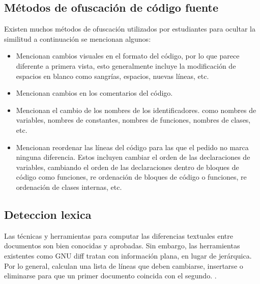 \subsection{Métodos de ofuscación de código fuente}
Existen muchos métodos de ofuscación utilizados por estudiantes para ocultar la similitud a continuación se mencionan algunos:
\begin{itemize}
    \item \cite{article3} Mencionan cambios visuales en el formato del código, por lo que parece diferente a primera vista, esto generalmente incluye la modificación de espacios en blanco como sangrías, espacios, nuevas líneas, etc.
    \item \cite{article3} Mencionan cambios en los comentarios del código.
    \item \cite{donaldson1981plagiarism} Mencionan el cambio de los nombres de los identificadores. como nombres de variables, nombres de constantes, nombres de funciones, nombres de clases, etc.
    \item \cite{donaldson1981plagiarism} Mencionan reordenar las líneas del código para las que el pedido no marca ninguna diferencia. Estos incluyen cambiar el orden de las declaraciones de variables, cambiando el orden de las declaraciones dentro de bloques de código como funciones, re ordenación de bloques de código o funciones, re ordenación de clases internas, etc.
\end{itemize}
\subsection{Deteccion lexica}
Las técnicas y herramientas para computar las diferencias textuales entre documentos son bien conocidas y aprobadas. Sin embargo, las herramientas existentes como GNU diff tratan con información plana, en lugar de jerárquica. Por lo general, calculan una lista de líneas que deben cambiarse, insertarse o eliminarse para que un primer documento coincida con el segundo. \cite{ChangeDistiller}.